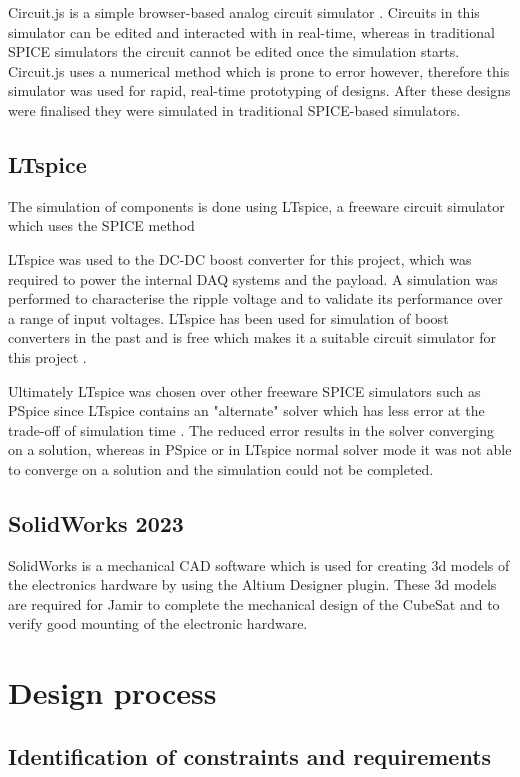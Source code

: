 \documentclass[a4paper,11pt]{article}
\begin{document}
Circuit.js is a simple browser-based analog circuit simulator \cite{falstad22falstad}. Circuits in this simulator can be edited and interacted with in real-time, whereas in traditional SPICE simulators the circuit cannot be edited once the simulation starts. Circuit.js uses a numerical method which is prone to error however, therefore this simulator was used for rapid, real-time prototyping of designs. After these designs were finalised they were simulated in traditional SPICE-based simulators.

\subsection{LTspice}

The simulation of components is done using LTspice, a freeware circuit simulator which uses the SPICE method

LTspice was used to the DC-DC boost converter for this project, which was required to power the internal DAQ systems and the payload. A simulation was performed to characterise the ripple voltage and to validate its performance over a range of input voltages. LTspice has been used for simulation of boost converters in the past and is free which makes it a suitable circuit simulator for this project \cite{giesselmann2019modeling}.

Ultimately LTspice was chosen over other freeware SPICE simulators such as PSpice since LTspice contains an "alternate" solver which has less error at the trade-off of simulation time \cite{ltspice2022}. The reduced error results in the solver converging on a solution, whereas in PSpice or in LTspice normal solver mode it was not able to converge on a solution and the simulation could not be completed.

\subsection{SolidWorks 2023}
SolidWorks is a mechanical CAD software which is used for creating 3d models of the electronics hardware by using the Altium Designer plugin. These 3d models are required for Jamir to complete the mechanical design of the CubeSat and to verify good mounting of the electronic hardware.

\section{Design process}

\subsection{Identification of constraints and requirements}
\label{sec:constraints-and-requirements}
\end{document}
